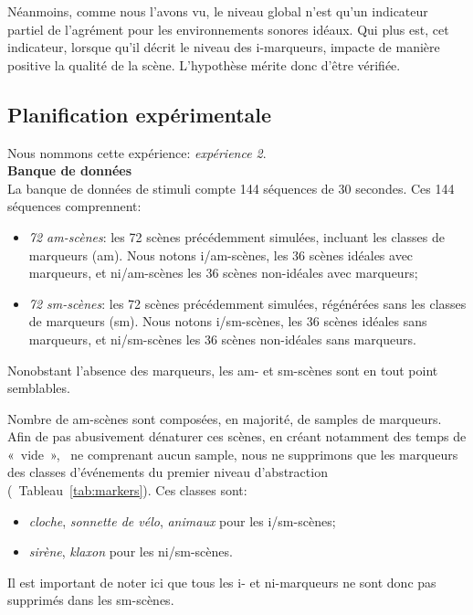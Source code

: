 Néanmoins, comme nous l'avons vu, le niveau global n'est qu'un indicateur partiel de l'agrément pour les environnements sonores idéaux. Qui plus est, cet indicateur, lorsque qu'il décrit le niveau des i-marqueurs, impacte de manière positive la qualité de la scène. L'hypothèse mérite donc d'être vérifiée.

\subsection{Planification expérimentale}

Nous nommons cette expérience: \emph{expérience 2}. \\

{\setlength{\parindent}{0cm}\textbf{Banque de données}} \\

La banque de données de stimuli compte 144 séquences de 30 secondes. Ces 144 séquences comprennent:

\begin{itemize}
\item \emph{72 am-scènes}: les 72 scènes précédemment simulées, incluant les classes de marqueurs (am). Nous notons i/am-scènes, les 36 scènes idéales avec marqueurs, et ni/am-scènes les 36 scènes non-idéales avec marqueurs;
\item \emph{72 sm-scènes}: les 72 scènes précédemment simulées, régénérées sans les classes de marqueurs (sm). Nous notons i/sm-scènes, les 36 scènes idéales sans marqueurs, et ni/sm-scènes les 36 scènes non-idéales sans marqueurs.
\end{itemize}

Nonobstant l'absence des marqueurs, les am- et sm-scènes sont en tout point semblables. 

Nombre de am-scènes sont composées, en majorité, de samples de marqueurs. Afin de pas abusivement dénaturer ces scènes, en créant notamment des temps de «~vide~», \ie~ne comprenant aucun sample, nous ne supprimons que les marqueurs des classes d'événements du premier niveau d'abstraction (\cf~Tableau~\ref{tab:markers}). Ces classes sont: 

\begin{itemize}
\item \emph{cloche}, \emph{sonnette de vélo}, \emph{animaux} pour les i/sm-scènes;
\item \emph{sirène}, \emph{klaxon} pour les ni/sm-scènes.
\end{itemize}
 
Il est important de noter ici que tous les i- et ni-marqueurs ne sont donc pas supprimés dans les sm-scènes. \\
 
